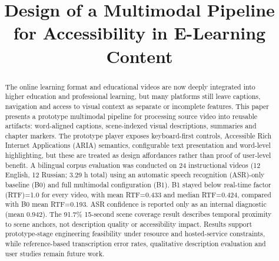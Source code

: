 ﻿\documentclass[conference]{IEEEtran}
\begin{document}
\title{Design of a Multimodal Pipeline for Accessibility in E-Learning Content}

\author{
\and
{}
}

\maketitle

\begin{abstract}
The online learning format and educational videos are now deeply integrated into higher education and professional learning, but many platforms still leave captions, navigation and access to visual context as separate or incomplete features. This paper presents a prototype multimodal pipeline for processing source video into reusable artifacts: word-aligned captions, scene-indexed visual descriptions, summaries and chapter markers. The prototype player exposes keyboard-first controls, Accessible Rich Internet Applications (ARIA) semantics, configurable text presentation and word-level highlighting, but these are treated as design affordances rather than proof of user-level benefit. A bilingual corpus evaluation was conducted on 24 instructional videos (12 English, 12 Russian; 3.29 h total) using an automatic speech recognition (ASR)-only baseline (B0) and full multimodal configuration (B1). B1 stayed below real-time factor (RTF)=1.0 for every video, with mean RTF=0.433 and median RTF=0.424, compared with B0 mean RTF=0.193. ASR confidence is reported only as an internal diagnostic (mean 0.942). The 91.7\% 15-second scene coverage result describes temporal proximity to scene anchors, not description quality or accessibility impact. Results support prototype-stage engineering feasibility under resource and hosted-service constraints, while reference-based transcription error rates, qualitative description evaluation and user studies remain future work.

\end{abstract}
\end{document}

